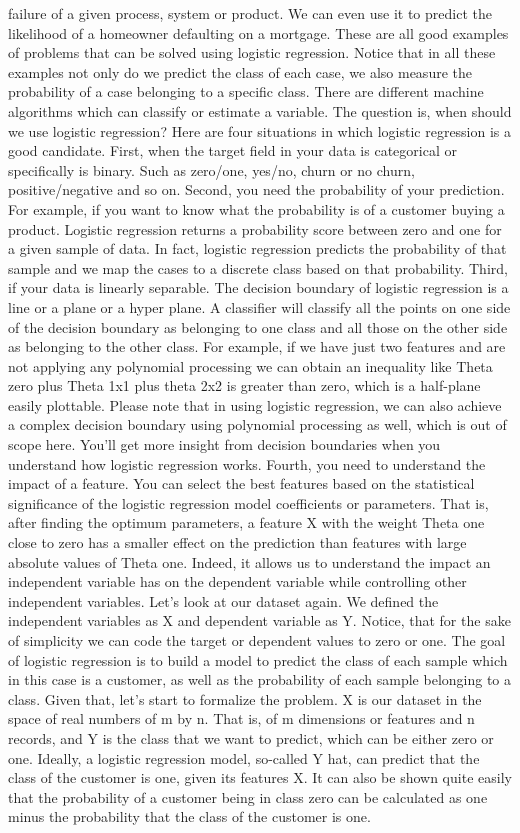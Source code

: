 failure of a given process, system or product. We can even use it to predict the likelihood of a homeowner defaulting on a mortgage. These are all good examples of problems that can be solved using logistic regression. Notice that in all these examples not only do we predict the class of each case, we also measure the probability of a case belonging to a specific class. There are different machine algorithms which can classify or estimate a variable. The question is, when should we use logistic regression? Here are four situations in which logistic regression is a good candidate. First, when the target field in your data is categorical or specifically is binary. Such as zero/one, yes/no, churn or no churn, positive/negative and so on. Second, you need the probability of your prediction. For example, if you want to know what the probability is of a customer buying a product. Logistic regression returns a probability score between zero and one for a given sample of data. In fact, logistic regression predicts the probability of that sample and we map the cases to a discrete class based on that probability. Third, if your data is linearly separable. The decision boundary of logistic regression is a line or a plane or a hyper plane. A classifier will classify all the points on one side of the decision boundary as belonging to one class and all those on the other side as belonging to the other class. For example, if we have just two features and are not applying any polynomial processing we can obtain an inequality like Theta zero plus Theta 1x1 plus theta 2x2 is greater than zero, which is a half-plane easily plottable. Please note that in using logistic regression, we can also achieve a complex decision boundary using polynomial processing as well, which is out of scope here. You'll get more insight from decision boundaries when you understand how logistic regression works. Fourth, you need to understand the impact of a feature. You can select the best features based on the statistical significance of the logistic regression model coefficients or parameters. That is, after finding the optimum parameters, a feature X with the weight Theta one close to zero has a smaller effect on the prediction than features with large absolute values of Theta one. Indeed, it allows us to understand the impact an independent variable has on the dependent variable while controlling other independent variables. Let's look at our dataset again. We defined the independent variables as X and dependent variable as Y. Notice, that for the sake of simplicity we can code the target or dependent values to zero or one. The goal of logistic regression is to build a model to predict the class of each sample which in this case is a customer, as well as the probability of each sample belonging to a class. Given that, let's start to formalize the problem. X is our dataset in the space of real numbers of m by n. That is, of m dimensions or features and n records, and Y is the class that we want to predict, which can be either zero or one. Ideally, a logistic regression model, so-called Y hat, can predict that the class of the customer is one, given its features X. It can also be shown quite easily that the probability of a customer being in class zero can be calculated as one minus the probability that the class of the customer is one. 
